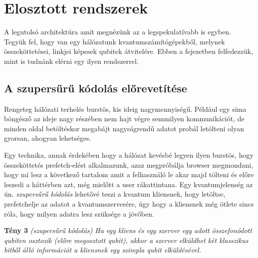 \chapter{Elosztott rendszerek}\label{sect:distributed}
\hspace{2mm} A legutolsó architektúra amit megnézünk az a legspekulatívabb is egyben.
Tegyük fel, hogy van egy hálózatunk kvantumszámítógépekből, melynek összeköttetései, linkjei képesek qubitek átvitelére.
Ebben a fejezetben felfedezzük, mint is tudnánk elérni egy ilyen rendszerrel.
\section{A szupersűrű kódolás előrevetítése}
\hspace{2mm} Rengeteg hálózati terhelés burstös, kis ideig nagymennyiségű.
Például egy sima böngésző az ideje nagy részében nem hajt végre semmilyen kommunikációt, de minden oldal betöltéskor megabájt nagyságrendű adatot probál letölteni olyan gyorsan, ahogyan lehetséges.

\indent Egy technika, annak érdekében hogy a hálózat kevésbé legyen ilyen burstös, hogy összeköttetés prefetch-elést alkalmazunk, azaz megpróbálja browser megmondani, hogy mi lesz a következő tartalom amit a felhasználó le akar majd tölteni és előre leszedi a háttérben azt, még mielőtt a user rákattintana.
Egy kvantumjelenség az ún. \textit{szupersűrű kódolás} lehetővé teszi a kvantum kliensnek, hogy letöltse, prefetchelje az adatot a kvantumszerverére, úgy hogy a kliensnek még ötlete sincs róla, hogy milyen adatra lesz szüksége a jövőben.

\vspace{2mm}
\textbf{Tény 3}  \textit{(szupersűrű kódolás) Ha egy kliens és egy szerver egy adott összefonódott qubiten osztozik (előre megosztott qubit), akkor a szerver elküldhet két klasszikus bitből álló információt a kliensnek egy szimpla qubit elküldésével.}
\vspace{2mm}

